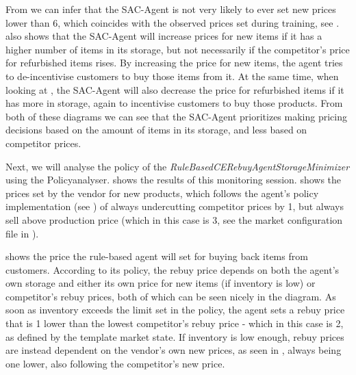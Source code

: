 From  we can infer that the SAC-Agent is not very likely to ever set new prices lower than 6, which coincides with the observed prices set during training, see .  also shows that the SAC-Agent will increase prices for new items if it has a higher number of items in its storage, but not necessarily if the competitor's price for refurbished items rises. By increasing the price for new items, the agent tries to de-incentivise customers to buy those items from it. At the same time, when looking at , the SAC-Agent will also decrease the price for refurbished items if it has more in storage, again to incentivise customers to buy those products. From both of these diagrams we can see that the SAC-Agent prioritizes making pricing decisions based on the amount of items in its storage, and less based on competitor prices.

Next, we will analyse the policy of the \emph{RuleBasedCERebuyAgentStorageMinimizer} using the Policyanalyser.  shows the results of this monitoring session.  shows the prices set by the vendor for new products, which follows the agent's policy implementation (see ) of always undercutting competitor prices by 1, but always sell above production price (which in this case is 3, see the market configuration file in ).

 shows the price the rule-based agent will set for buying back items from customers. According to its policy, the rebuy price depends on both the agent's own storage and either its own price for new items (if inventory is low) or competitor's rebuy prices, both of which can be seen nicely in the diagram. As soon as inventory exceeds the limit set in the policy, the agent sets a rebuy price that is 1 lower than the lowest competitor's rebuy price - which in this case is 2, as defined by the template market state. If inventory is low enough, rebuy prices are instead dependent on the vendor's own new prices, as seen in , always being one lower, also following the competitor's new price.


